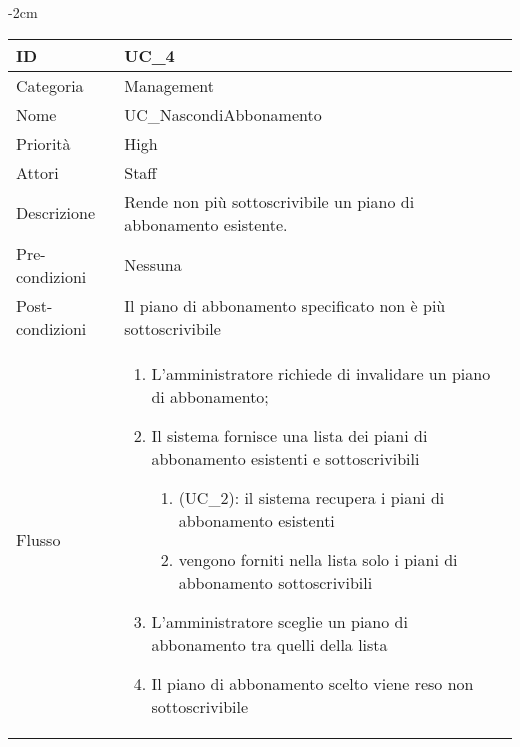 \begin{center}
\begin{table}[bp]
    \centering
    \addtolength{\leftskip} {-2cm}
\begin{tabular}{ |p{2.6cm}|p{13cm}|  }
\hline
ID & UC\_4 \\\hline
Categoria & Management\\\hline
Nome & UC\_NascondiAbbonamento\\\hline
Priorità & High \\\hline
Attori &  Staff \\\hline
Descrizione & Rende non più sottoscrivibile un piano di abbonamento esistente.\\\hline
Pre-condizioni &  Nessuna \\\hline
Post-condizioni &  Il piano di abbonamento specificato non è più sottoscrivibile\\\hline
Flusso &  	\vspace{-5mm} \begin{enumerate}
		\item L'amministratore richiede di invalidare un piano di abbonamento;
		\item Il sistema fornisce una lista dei piani di abbonamento esistenti e sottoscrivibili
			\begin{enumerate}[  ]
			\item (UC\_2): il sistema recupera i piani di abbonamento esistenti
			\item vengono forniti nella lista solo i piani di abbonamento sottoscrivibili
			\end{enumerate}
		\item L'amministratore sceglie un piano di abbonamento tra quelli della lista
		\item Il piano di abbonamento scelto viene reso non sottoscrivibile
		\end{enumerate}\\\hline
\end{tabular}
\label{table_use_case:4}\newline
\end{table}


\end{center}
